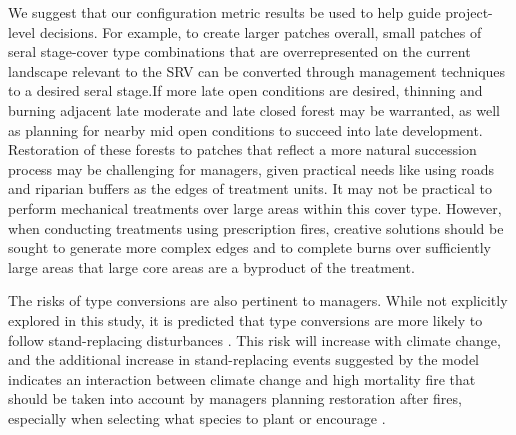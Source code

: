 \documentclass[12pt]{article}
\begin{document}
\begin{spacing}{1}
We suggest that our configuration metric results be used to help guide project-level decisions. For example, to create larger patches overall, small patches of seral stage-cover type combinations that are overrepresented on the current landscape relevant to the SRV can be converted through management techniques to a desired seral stage.If more late open conditions are desired, thinning and burning adjacent late moderate and late closed forest may be warranted, as well as planning for nearby mid open conditions to succeed into late development. Restoration of these forests to patches that reflect a more natural succession process may be challenging for managers, given practical needs like using roads and riparian buffers as the edges of treatment units. It may not be practical to perform mechanical treatments over large areas within this cover type. However, when conducting treatments using prescription fires, creative solutions should be sought to generate more complex edges and to complete burns over sufficiently large areas that large core areas are a byproduct of the treatment.

The risks of type conversions are also pertinent to managers. While not explicitly explored in this study, it is predicted that type conversions are more likely to follow stand-replacing disturbances \citep{Stephens2013}. This risk will increase with climate change, and the additional increase in stand-replacing events suggested by the model indicates an interaction between climate change and high mortality fire that should be taken into account by managers planning restoration after fires, especially when selecting what species to plant or encourage \citep{Fule2008,Schwartz2015}.



\end{spacing}
\end{document}
